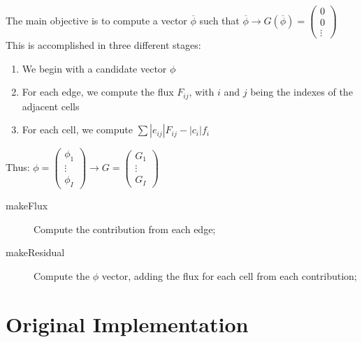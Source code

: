 \documentclass{beamer}
\begin{document}
\begin{frame}
	The main objective is to compute a vector $\overline{\phi}$ such that $\overline{\phi} \longrightarrow G(\overline{\phi}) = \left(\begin{array}{c}
	0\\ 
	0\\
	\vdots\end{array}\right)$
	This is accomplished in three different stages:
	\begin{enumerate}
	    \item {We begin with a candidate vector $\phi$} 
	    \item {For each edge, we compute the flux $F_{ij}$, with $i$ and $j$ being the indexes of the adjacent cells}
	    \item {For each cell, we compute $\sum |e_{ij}| F_{ij} - |c_i| f_i$}
	\end{enumerate}
	Thus: $\phi = \left(\begin{array}{c}
	\phi_1\\
	\vdots\\
	\phi_I
	\end{array}\right) \longrightarrow G = \left(\begin{array}{c}
	G_1\\
	\vdots\\
	G_I
	\end{array}\right)$
\end{frame}

\begin{frame}
	\begin{description}
		\item [makeFlux] Compute the contribution from each edge;
		\item [makeResidual] Compute the $\phi$ vector, adding the flux for each cell from each contribution;	
	\end{description}
\end{frame}

\section{Original Implementation}
\end{document}
